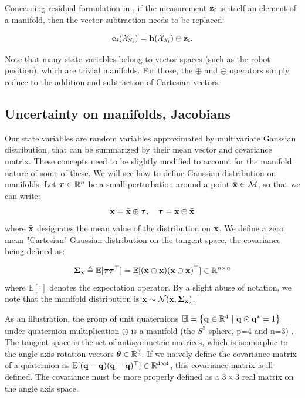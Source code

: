 Concerning residual formulation in , if the measurement ${\bf z}_i$ is itself an element of a manifold, 
then the vector subtraction needs to be replaced:

\begin{equation}
    {\bf e}_i(\mathcal{X}_{S_i}) = {\bf h}(\mathcal{X}_{S_i}) \ominus {\bf z}_i,
\end{equation}

Note that many state variables belong to vector spaces (such as the robot position), which are trivial manifolds. For those, the $\oplus$ and $\ominus$ operators
simply reduce to the addition and subtraction of Cartesian vectors.  



\subsection{Uncertainty on manifolds, Jacobians}
\label{sec:uncertainty_on_manifolds}
Our state variables are random variables approximated by multivariate Gaussian distribution, that can be summarized by their mean vector and covariance matrix.
These concepts need to be slightly modified to account for the manifold nature of some of these. We will see how to define Gaussian distribution on manifolds.
Let  ${\bm \tau} \in \mathbb{R}^n$ be a small perturbation around a point $\bar{{\bf x}} \in \mathcal{M}$, so that we can write:
%
\begin{equation}
    {\bf x} = \bar{{\bf x}} \oplus {\bm \tau}, \quad {\bm \tau} = {\bf x} \ominus \bar{{\bf x}}
\end{equation}
%
where $\bar{{\bf x}}$ designates the mean value of the distribution on ${\bf x}$. 
We define a zero mean "Cartesian" Gaussian distribution on the tangent space, the covariance being defined as:

\begin{equation}
    {\bm \Sigma}_{{\bf x}} \triangleq \mathbb{E}[{\bm \tau}{\bm \tau}^{\top}] = \mathbb{E}[({\bf x} \ominus \bar{{\bf x}})({\bf x} \ominus \bar{{\bf x}})^{\top}] \in \mathbb{R}^{n \times n}
\end{equation}
%
where $\mathbb{E}[\cdot]$ denotes the expectation operator.
By a slight abuse of notation, we note that the manifold distribution is ${\bf x} \sim \mathcal{N}({{\bf x}},{{\bm \Sigma}_{{\bf x}}})$.

As an illustration, the group of unit quaternions $\mathbb{H} = \left\{ {\bf q} \in \mathbb{R}^4~|~{\bf q} \odot {\bf q}^*=1 \right\}$ under quaternion multiplication 
$\odot$ is a manifold (the $S^3$ sphere, p=4 and n=3) \cite{sola2012quaternion}. 
The tangent space is the set of antisymmetric matrices, which is isomorphic to the angle axis rotation vectors ${\bm \theta} \in \mathbb{R}^3$.
If we naively define the covariance matrix of a quaternion as \mbox{$\mathbb{E}[({\bf q} - \bar{{\bf q}})({\bf q} - \bar{{\bf q}})^{\top}] \in \mathbb{R}^{4 \times 4}$}, 
this covariance matrix is ill-defined. The covariance must be more properly defined as a $3 \times 3$ real matrix on the angle axis space.


